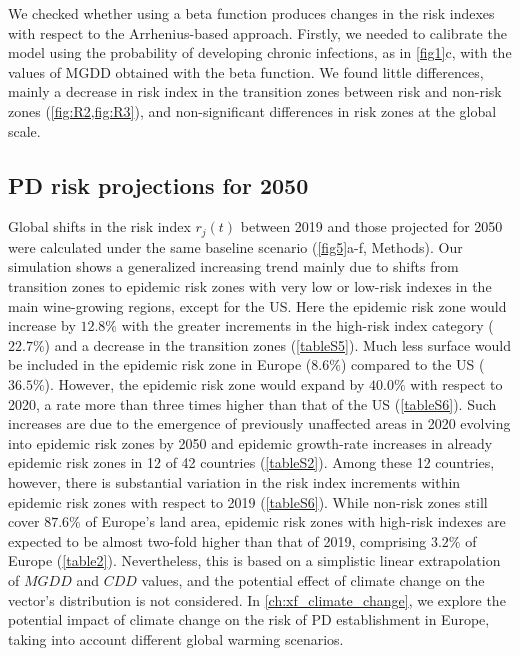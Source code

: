     We checked whether using a beta function produces changes in the risk
    indexes with respect to the Arrhenius-based approach. Firstly, we needed to
    calibrate the model using the probability of developing chronic infections,
    as in \cref{fig1}c, with the values of MGDD obtained with the beta
    function. We found little differences, mainly a decrease in risk index in
    the transition zones between risk and non-risk zones
    (\cref{fig:R2,fig:R3}), and non-significant differences in risk zones at
    the global scale.

    \subsection{PD risk projections for 2050}

    Global shifts in the risk index $r_j(t)$ between 2019 and those projected
    for 2050 were calculated under the same baseline scenario (\cref{fig5}a-f,
    Methods). Our simulation shows a generalized increasing trend mainly due to
    shifts from transition zones to epidemic risk zones with very low or
    low-risk indexes in the main wine-growing regions, except for the US. Here
    the epidemic risk zone would increase by $12.8\%$ with the greater
    increments in the high-risk index category ($22.7\%$) and a decrease in the
    transition zones (\cref{tableS5}). Much less surface would be
    included in the epidemic risk zone in Europe ($8.6\%$) compared to the US
    ($36.5\%$). However, the epidemic risk zone would expand by $40.0\%$ with
    respect to 2020, a rate more than three times higher than
    that of the US (\cref{tableS6}). Such increases are due to the
    emergence of previously unaffected areas in 2020 evolving into
    epidemic risk zones by 2050 and epidemic growth-rate increases in already
    epidemic risk zones in 12 of 42 countries (\cref{tableS2}). Among
    these 12 countries, however, there is substantial variation in the risk
    index increments within epidemic risk zones with respect to 2019
    (\cref{tableS6}). While non-risk zones still cover $87.6\%$ of
    Europe's land area, epidemic risk zones with high-risk indexes are expected
    to be almost two-fold higher than that of 2019, comprising $3.2\%$ of
    Europe (\cref{table2}). Nevertheless, this is based on a simplistic
    linear extrapolation of $MGDD$ and $CDD$ values, and the potential effect
    of
    climate change on the vector's distribution is not considered. In
    \cref{ch:xf_climate_change}, we explore the potential impact of climate
    change on the risk of PD establishment in Europe, taking into account
    different global warming scenarios.

